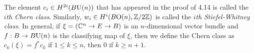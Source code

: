 \documentclass{../../../small}
\begin{document}
\begin{defn*}[4.15]
The element $c_i\in H^{2i}(B\mathrm{U}(n))$ that has appeared in the proof of 4.14 is called the \emph{$i$th Chern class}.
Similarly, $w_i\in H^i(B\mathrm{O}(n),\mathbb{Z}/2\mathbb{Z})$ is called the \emph{$i$th Stiefel-Whitney class}.
In general, if $\xi=(\mathbb{C}^n\to E\to B)$ is an $n$-dimensional vector bundle and $f:B\to B\mathrm{U}(n)$ is the classifying map of $\xi$, then we define the Chern class as $c_k(\xi)=f^*c_k$ if $1\le k\le n$, then $0$ if $k\ge n+1$.
\end{defn*}
\end{document}
